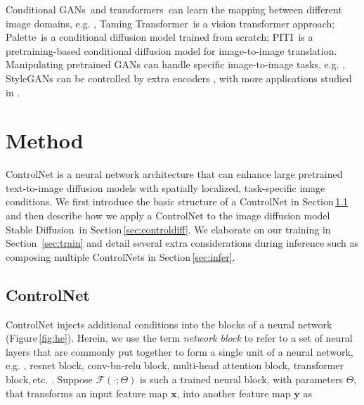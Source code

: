 	 Conditional
	GANs\,\cite{choi2018stargan,isola2017image,park2019semantic,wang2018high,zhang2020cross,zhou2021cocosnet,CycleGAN2017,zhu2017toward} and transformers\,\cite{chen2021pre,esser2021taming, ramesh2021zero} can learn the mapping between different image domains, e.g. , Taming
	Transformer\,\cite{esser2021taming} is a vision transformer approach; Palette\,\cite{saharia2022palette} is a conditional diffusion model trained from scratch; PITI\,\cite{wang2022pretraining} is a pretraining-based conditional diffusion model for image-to-image translation. Manipulating pretrained GANs can handle specific image-to-image tasks, e.g. , StyleGANs can be controlled by extra encoders \cite{richardson2021encoding}, with more applications studied in \cite{alaluf2021matter,gal2022stylegan,karras2021style,katzir2022multi,mokady2022selfdistilled,nitzan2022mystyle,Patashnik_2021_ICCV,richardson2021encoding}.

	\section{Method}
	\label{sec:method}

	ControlNet is a neural network architecture that can enhance large pretrained text-to-image diffusion models with spatially localized, task-specific image conditions.  We first introduce the basic structure of a ControlNet in Section\,\ref{sec:control} and then describe how we apply a ControlNet to the image diffusion model Stable
	Diffusion\,\cite{rombach2021highresolution} in
	Section\,\ref{sec:controldiff}.  We elaborate on our training in
	Section~\ref{sec:train} and detail several extra considerations during inference such as composing multiple ControlNets in
	Section\,\ref{sec:infer}.

	\subsection{ControlNet}
	\label{sec:control}

	ControlNet injects additional conditions into the blocks of a neural network (Figure\,\ref{fig:he}). Herein, we use the term {\em
		network block} to refer to a set of neural layers that are commonly put together to form a single unit of a neural network, e.g. , resnet block, conv-bn-relu block, multi-head attention block, transformer
	block,\,etc. . Suppose $\mathcal{F}(\cdot;\Theta)$ is such a trained neural block, with parameters $\Theta$, that transforms an input feature map $\bm{x}$,
	into another feature map $\bm{y}$ as

